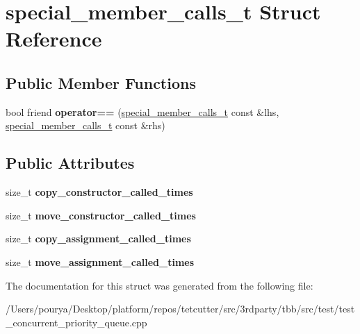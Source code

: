 \hypertarget{structspecial__member__calls__t}{}\section{special\+\_\+member\+\_\+calls\+\_\+t Struct Reference}
\label{structspecial__member__calls__t}
\subsection*{Public Member Functions}
\begin{DoxyCompactItemize}
\item 
\hypertarget{structspecial__member__calls__t_a2777d9451d99e178cfa14012dfb7d323}{}bool friend {\bfseries operator==} (\hyperlink{structspecial__member__calls__t}{special\+\_\+member\+\_\+calls\+\_\+t} const \&lhs, \hyperlink{structspecial__member__calls__t}{special\+\_\+member\+\_\+calls\+\_\+t} const \&rhs)\label{structspecial__member__calls__t_a2777d9451d99e178cfa14012dfb7d323}

\end{DoxyCompactItemize}
\subsection*{Public Attributes}
\begin{DoxyCompactItemize}
\item 
\hypertarget{structspecial__member__calls__t_ad8804bf2d5317a8a180d4bd22172d495}{}size\+\_\+t {\bfseries copy\+\_\+constructor\+\_\+called\+\_\+times}\label{structspecial__member__calls__t_ad8804bf2d5317a8a180d4bd22172d495}

\item 
\hypertarget{structspecial__member__calls__t_a12d19d64c16200cfd27997e5414386c6}{}size\+\_\+t {\bfseries move\+\_\+constructor\+\_\+called\+\_\+times}\label{structspecial__member__calls__t_a12d19d64c16200cfd27997e5414386c6}

\item 
\hypertarget{structspecial__member__calls__t_af09ed6d1b2ba9e69e05d64dc52a4adbc}{}size\+\_\+t {\bfseries copy\+\_\+assignment\+\_\+called\+\_\+times}\label{structspecial__member__calls__t_af09ed6d1b2ba9e69e05d64dc52a4adbc}

\item 
\hypertarget{structspecial__member__calls__t_a57c5006892d3f9ab959717c81d089b87}{}size\+\_\+t {\bfseries move\+\_\+assignment\+\_\+called\+\_\+times}\label{structspecial__member__calls__t_a57c5006892d3f9ab959717c81d089b87}

\end{DoxyCompactItemize}


The documentation for this struct was generated from the following file\+:\begin{DoxyCompactItemize}
\item 
/\+Users/pourya/\+Desktop/platform/repos/tetcutter/src/3rdparty/tbb/src/test/test\+\_\+concurrent\+\_\+priority\+\_\+queue.\+cpp\end{DoxyCompactItemize}
